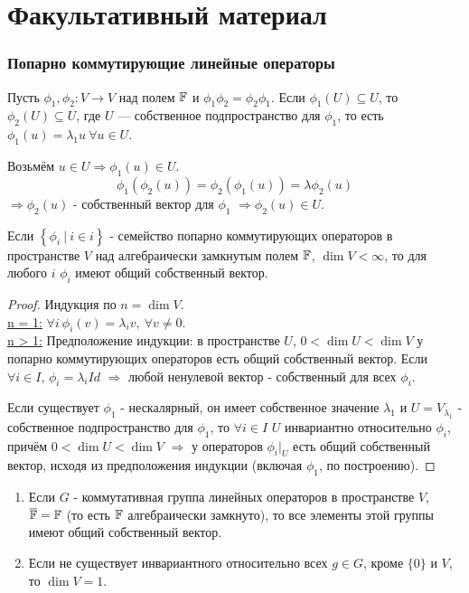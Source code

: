 \section{Факультативный материал}
\subsubsection*{Попарно коммутирующие линейные операторы}
Пусть $\phi_1, \phi_2: V \to V$ над полем $\mathbb{F}$ и $\phi_1 \phi_2 = \phi_2 \phi_1$. Если $\phi_1(U) \subseteq U$, то $\phi_2(U) \subseteq U$, где $U$ — собственное подпространство для $\phi_1$, то есть $\phi_1(u) = \lambda_1 u \ \forall u \in U$.

Возьмём $u \in U \Longrightarrow \phi_1(u) \in U$.
\[\phi_1(\phi_2(u)) = \phi_2(\phi_1(u)) = \lambda \phi_2(u)\]
$\Longrightarrow \phi_2(u)$ - собственный вектор для $\phi_1$ $\Longrightarrow \phi_2(u) \in U$.

\begin{theorem}
    Если $\left\{\phi_i \ | \ i \in i\right\}$ - семейство попарно коммутирующих операторов в пространстве $V$ над алгебраически замкнутым полем $\mathbb{F}$, $\dim{V} < \infty$, то для любого $i$ $\phi_i$ имеют общий собственный вектор.
\end{theorem} 
\begin{proof}
    Индукция по $n = \dim{V}$.\\
    \noindent \underline{n = 1:} $\forall i \ \phi_i(v) = \lambda_i v, \ \forall v \neq 0.$\\
    \noindent \underline{n > 1:} Предположение индукции: в пространстве $U$, $0 < \dim{U} < \dim{V}$ у попарно коммутирующих операторов есть общий собственный вектор. Если $\forall i \in I$, $\phi_i = \lambda_i Id$ $\Longrightarrow$ любой ненулевой вектор - собственный для всех $\phi_i$.

    Если существует $\phi_1$ - нескалярный, он имеет собственное значение $\lambda_1$ и $U = V_{\lambda_1}$ - собственное подпространство для $\phi_1$, то $\forall i \in I$ $U$ инвариантно относительно $\phi_i$, причём $0 < \dim{U} < \dim{V}$ $\Longrightarrow$ у операторов $\phi_i |_U$ есть общий собственный вектор, исходя из предположения индукции (включая $\phi_1$, по построению).
\end{proof} 

\begin{consequense}
    \begin{enumerate}
        $\empty$
        \item Если $G$ - коммутативная группа линейных операторов в пространстве $V$, $\overline{\mathbb{F}} = \mathbb{F}$ (то есть $\mathbb{F}$ алгебраически замкнуто), то все элементы этой группы имеют общий собственный вектор.
        \item Если не существует инвариантного относительно всех $g \in G$, кроме $\{0\}$ и $V$, то $\dim{V} = 1$.
    \end{enumerate}
\end{consequense}

